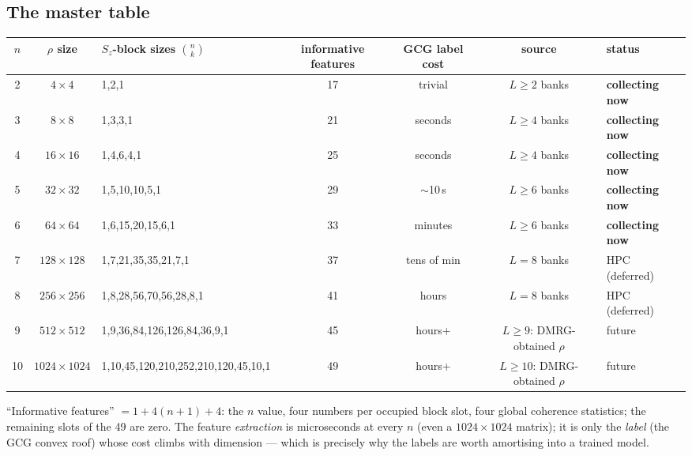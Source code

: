 \documentclass[11pt]{article}
\begin{document}
\subsection{The master table}
\begin{center}
\small
\begin{tabular}{@{}ccp{2.9cm}cccl@{}}
\toprule
$n$ & $\rho$ size & $S_z$-block sizes $\binom{n}{k}$ & informative
  features & GCG label cost & source & status \\
\midrule
2  & $4\times4$      & 1,2,1                   & 17 & trivial   & $L\ge2$ banks & \textbf{collecting now} \\
3  & $8\times8$      & 1,3,3,1                 & 21 & seconds   & $L\ge4$ banks & \textbf{collecting now} \\
4  & $16\times16$    & 1,4,6,4,1               & 25 & seconds   & $L\ge4$ banks & \textbf{collecting now} \\
5  & $32\times32$    & 1,5,10,10,5,1           & 29 & $\sim$10\,s & $L\ge6$ banks & \textbf{collecting now} \\
6  & $64\times64$    & 1,6,15,20,15,6,1        & 33 & minutes   & $L\ge6$ banks & \textbf{collecting now} \\
7  & $128\times128$  & 1,7,21,35,35,21,7,1     & 37 & tens of min & $L{=}8$ banks & HPC (deferred) \\
8  & $256\times256$  & 1,8,28,56,70,56,28,8,1  & 41 & hours     & $L{=}8$ banks & HPC (deferred) \\
9  & $512\times512$  & 1,9,36,84,126,126,84,36,9,1 & 45 & hours+ & $L{\ge}9$: DMRG-obtained $\rho$ & future \\
10 & $1024\times1024$& 1,10,45,120,210,252,210,120,45,10,1 & 49 & hours+ &
  $L{\ge}10$: DMRG-obtained $\rho$ & future \\
\bottomrule
\end{tabular}
\end{center}
``Informative features'' $=1+4(n{+}1)+4$: the $n$ value, four numbers per
occupied block slot, four global coherence statistics; the remaining slots of
the 49 are zero. The feature \emph{extraction} is microseconds at every $n$
(even a $1024\times1024$ matrix); it is only the \emph{label} (the GCG convex
roof) whose cost climbs with dimension --- which is precisely why the labels
are worth amortising into a trained model.
\end{document}
